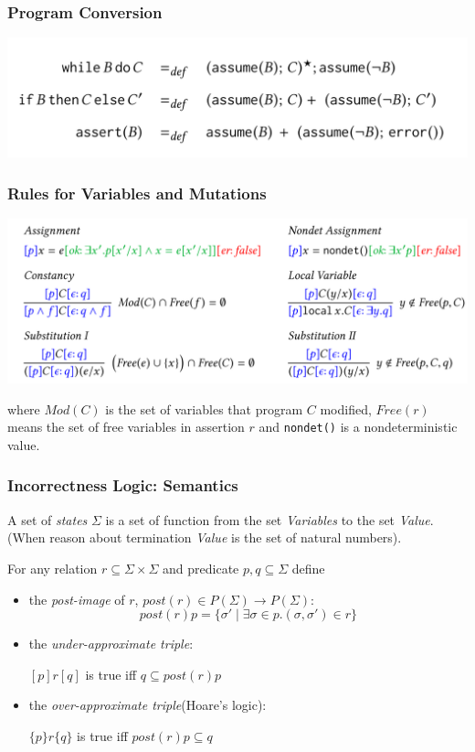 \documentclass[11pt]{beamer}
\begin{document}
\begin{frame}\frametitle{Program Conversion}
\begin{center}
\includegraphics[scale = 0.30]{7.png}

\end{center}

\end{frame}
\begin{frame}\frametitle{Rules for Variables and Mutations}
\begin{center}
\includegraphics[scale = 0.30]{8.png}

\end{center}
where $Mod(C)$ is the set of variables that program $C$ modified, $Free(r)$ means the set of free variables in assertion $r$ and \texttt{nondet()} is a nondeterministic value.
\end{frame}
\begin{frame}\frametitle{Incorrectness Logic: Semantics}
A set of \textit{states} $\Sigma$ is a set of function from the set \textit{Variables} to the set \textit{Value}.(When reason about termination \textit{Value} is the set of natural numbers).

\begin{definition}
For any relation $r\subseteq \Sigma \times \Sigma$ and predicate $p,q\subseteq \Sigma$ define
\begin{itemize}

\item the \textit{post-image} of $r$, $post(r)\in P(\Sigma)\rightarrow P(\Sigma)$:
\[post(r)p = \{\sigma'\mid \exists \sigma \in p. (\sigma, \sigma')\in r\}\]
\item the \textit{under-approximate triple}:

$[p]r[q]$ is true iff $q\subseteq post(r)p$

\item the \textit{over-approximate triple}(Hoare's logic):

$\{p\}r\{q\}$ is true iff $post(r)p \subseteq q$
\end{itemize}


\end{definition}



\end{frame}
\end{document}
